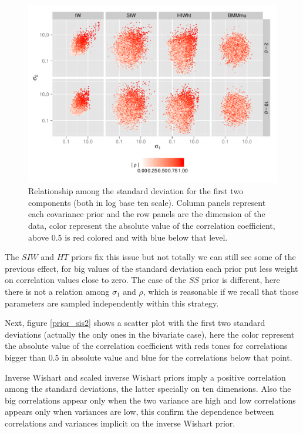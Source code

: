 \documentclass{article}
\begin{document}
\begin{figure}[htbp]
\begin{center}
 \includegraphics[width=\textwidth ]{prior_sis2} 
  \vspace{-.5in}
\caption{Relationship among the standard deviation for the first two components (both in log base ten scale).  Column panels represent each covariance prior and the row panels are the dimension of the data, color represent the absolute value of the correlation coefficient, above 0.5 is red colored and with blue below that level.  \label{priorsim}}
\end{center}
\end{figure}

The $SIW$ and $HT$ priors fix this issue but not totally we can still see some of the previous effect, for big values of the standard deviation each prior put less weight on correlation values close to zero.  The case of the $SS$ prior is different, here there is not a relation among $\sigma_1$ and $\rho$, which is reasonable if we recall that those parameters are sampled independently within this strategy. 

Next, figure \ref{prior_sis2} shows a scatter plot with the first two standard deviations (actually the only ones in the bivariate case), here the color represent the absolute value of the correlation coefficient with reds tones for correlations bigger than 0.5 in absolute value and blue for the correlations below that point. 

Inverse Wishart and scaled inverse Wishart priors imply a positive correlation among the standard deviations, the latter specially on ten dimensions. Also the big correlations appear only when the two variance are high and low correlations appears only when variances are low, this confirm the dependence between correlations and variances implicit on the inverse Wishart prior. 
\end{document}
